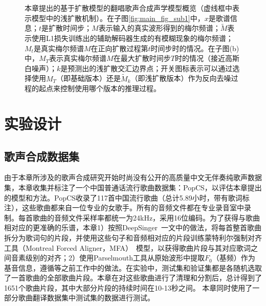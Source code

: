 \begin{figure}[!h]
    \centering
    \caption{本章提出的基于扩散模型的翻唱歌声合成声学模型概览（虚线框中表示模型中的浅扩散机制）。在子图\ref{fig:main_fig_sub1}中，$x$是歌谱信息；$t$是扩散时间步；$M$表示输入的真实波形得到的梅尔频谱；$\widetilde{M}$表示使用L1损失训练出的辅助解码器生成的有模糊现象的梅尔频谱；$M_t$是真实梅尔频谱$M$在正向扩散过程第$t$时间步时的情况。在子图(b)中，$M_T$表示真实梅尔频谱$M$在最大扩散时间步$T$时的情况（接近高斯白噪声）；$k$是预测出的浅扩散交汇边界点；开关图标表示可以通过选择使用$M_T$（即基础版本）还是$\widetilde{M}_k$（即浅扩散版本）作为反向去噪过程的起点来控制使用哪个版本的推理过程。}
    \label{fig:main_fig}
\end{figure}
\section{实验设计}
\subsection{歌声合成数据集}
由于本章所涉及的歌声合成研究开始时尚没有公开的高质量中文无伴奏纯歌声数据集，本章收集并标注了一个中国普通话流行歌曲数据集：PopCS，以评估本章提出的模型和方法。PopCS收录了117首中国流行歌曲（总计5.89小时，带有歌词标注），这些歌曲都来自一位专业的女歌手。所有的音频文件都在专业录音室中录制。每首歌曲的音频文件采样率都统一为24kHz，采用16位编码。为了获得与歌曲相对应的更准确的乐谱，本章1）按照DeepSinger~\citep{ren2020deepsinger}一文中的做法，将每首整首歌曲拆分为歌词句的片段，并使用这些句子和音频相对应的片段训练蒙特利尔强制对齐工具（Montreal Forced Aligner，MFA）~\citep{mcauliffe2017montreal}模型，以获得歌曲片段与其对应歌词之间音素级别的对齐；2）使用Parselmouth工具从原始波形中提取$F_0$（基频）作为基音信息，遵循\citet{wu2020adversarially,blaauw2020sequence,ren2020deepsinger}等之前工作中的做法。在实验中，测试集和验证集都是各随机选取了一首歌曲的全部歌曲片段。本章在对这些歌曲进行了清理和分割后，总计得到了1651个歌曲片段，其中大部分片段的持续时间在10-13秒之间。
本章同时使用了一部分歌曲翻译数据集中测试集的数据进行测试。
